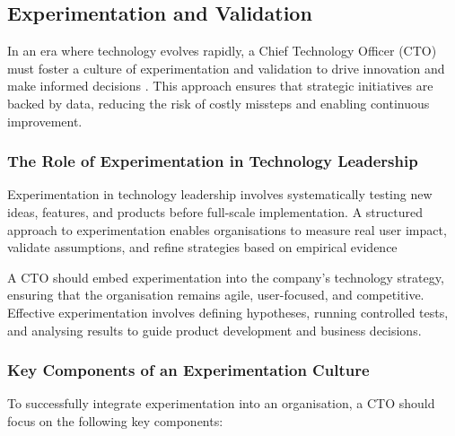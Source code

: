 \subsection{Experimentation and Validation}

In an era where technology evolves rapidly, a Chief Technology Officer (CTO) must foster a culture of experimentation and validation to drive innovation and make informed decisions \cite{thomke2020experimentation}. This approach ensures that strategic initiatives are backed by data, reducing the risk of costly missteps and enabling continuous improvement.

\subsubsection{The Role of Experimentation in Technology Leadership}
Experimentation in technology leadership involves systematically testing new ideas, features, and products before full-scale implementation. A structured approach to experimentation enables organisations to measure real user impact, validate assumptions, and refine strategies based on empirical evidence \cite{kohavi2009controlled}

A CTO should embed experimentation into the company’s technology strategy, ensuring that the organisation remains agile, user-focused, and competitive. Effective experimentation involves defining hypotheses, running controlled tests, and analysing results to guide product development and business decisions.

\subsubsection{Key Components of an Experimentation Culture}
To successfully integrate experimentation into an organisation, a CTO should focus on the following key components:

